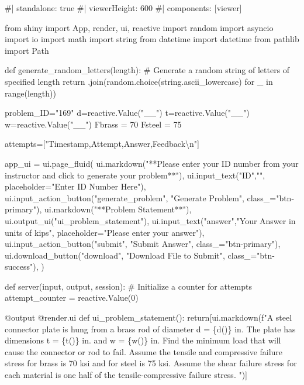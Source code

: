 \documentclass[
  letterpaper,
  DIV=11,
  numbers=noendperiod]{scrreprt}
\newenvironment{Shaded}{\begin{snugshade}}{\end{snugshade}}
\newcommand{\NormalTok}[1]{\textcolor[rgb]{0.00,0.23,0.31}{#1}}
\begin{document}
\begin{Shaded}
\begin{Highlighting}[]
\NormalTok{\#| standalone: true}
\NormalTok{\#| viewerHeight: 600}
\NormalTok{\#| components: [viewer]}

\NormalTok{from shiny import App, render, ui, reactive}
\NormalTok{import random}
\NormalTok{import asyncio}
\NormalTok{import io}
\NormalTok{import math}
\NormalTok{import string}
\NormalTok{from datetime import datetime}
\NormalTok{from pathlib import Path}

\NormalTok{def generate\_random\_letters(length):}
\NormalTok{    \# Generate a random string of letters of specified length}
\NormalTok{    return \textquotesingle{}\textquotesingle{}.join(random.choice(string.ascii\_lowercase) for \_ in range(length))}

\NormalTok{problem\_ID="169"}
\NormalTok{d=reactive.Value("\_\_")}
\NormalTok{t=reactive.Value("\_\_")}
\NormalTok{w=reactive.Value("\_\_")}
\NormalTok{Fbrass = 70}
\NormalTok{Fsteel = 75}


\NormalTok{attempts=["Timestamp,Attempt,Answer,Feedback\textbackslash{}n"]}

\NormalTok{app\_ui = ui.page\_fluid(}
\NormalTok{    ui.markdown("**Please enter your ID number from your instructor and click to generate your problem**"),}
\NormalTok{    ui.input\_text("ID","", placeholder="Enter ID Number Here"),}
\NormalTok{    ui.input\_action\_button("generate\_problem", "Generate Problem", class\_="btn{-}primary"),}
\NormalTok{    ui.markdown("**Problem Statement**"),}
\NormalTok{    ui.output\_ui("ui\_problem\_statement"),}
\NormalTok{    ui.input\_text("answer","Your Answer in units of kips", placeholder="Please enter your answer"),}
\NormalTok{    ui.input\_action\_button("submit", "Submit Answer", class\_="btn{-}primary"),}
\NormalTok{    ui.download\_button("download", "Download File to Submit", class\_="btn{-}success"),}
\NormalTok{)}


\NormalTok{def server(input, output, session):}
\NormalTok{    \# Initialize a counter for attempts}
\NormalTok{    attempt\_counter = reactive.Value(0)}

\NormalTok{    @output}
\NormalTok{    @render.ui}
\NormalTok{    def ui\_problem\_statement():}
\NormalTok{        return[ui.markdown(f"A steel connector plate is hung from a brass rod of diameter d = \{d()\} in. The plate has dimensions t = \{t()\} in. and w = \{w()\} in. Find the minimum load that will cause the connector or rod to fail. Assume the tensile and compressive failure stress for brass is 70 ksi and for steel is 75 ksi. Assume the shear failure stress for each material is one half of the tensile{-}compressive failure stress. ")]}
    

\end{Highlighting}
\end{Shaded}
\end{document}
